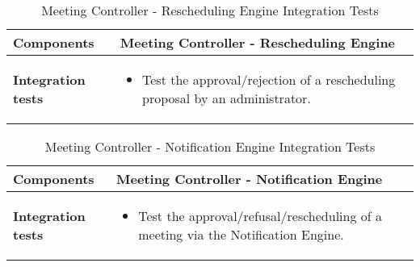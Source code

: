 \begin{table}[H]	
	\centering
	\def\arraystretch{1.5}
	\begin{tabular}{|m{4cm}|m{12cm}|}
		\hline
		\textbf{Components} & Meeting Controller - Rescheduling Engine \\ \hline
		\textbf{Integration tests} & 
			\begin{itemize}
			\item Test the approval/rejection of a rescheduling proposal by an administrator.
			\end{itemize} \\ \hline
	\end{tabular}
	\caption{Meeting Controller - Rescheduling Engine Integration Tests}
\end{table}

\begin{table}[H]	
	\centering
	\def\arraystretch{1.5}
	\begin{tabular}{|m{4cm}|m{12cm}|}
		\hline
		\textbf{Components} & Meeting Controller - Notification Engine \\ \hline
		\textbf{Integration tests} & 
			\begin{itemize}
			\item Test the approval/refusal/rescheduling of a meeting via the Notification Engine.
			\end{itemize} \\ \hline
	\end{tabular}
	\caption{Meeting Controller - Notification Engine Integration Tests}
\end{table}

\clearpage
